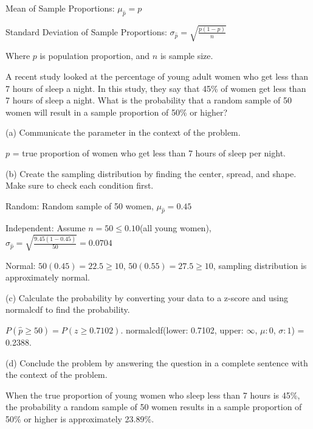\documentclass[../stats.tex]{subfiles}
\begin{document}
Mean of Sample Proportions: $\mu_{\hat{p}}=p$

Standard Deviation of Sample Proportions: $\sigma_{\hat{p}}=\sqrt{\frac{p(1-p)}{n}}$

Where $p$ is population proportion, and $n$ is sample size.

\pagebreak
\begin{example}
    A recent study looked at the percentage of young adult women who get less than 7 hours of sleep a night. In this study, they say that 45\% of women get less than 7 hours of sleep a night.
    What is the probability that a random sample of 50 women will result in a sample proportion of 50\% or higher?

    (a) Communicate the parameter in the context of the problem.

    $p$ = true proportion of women who get less than 7 hours of sleep per night.

    (b) Create the sampling distribution by finding the center, spread, and shape. Make sure to check each condition first.

    Random: Random sample of 50 women, $\mu_{\hat{p}}=0.45$

    Independent: Assume $n=50\leq 0.10$(all young women), $\sigma_{\hat{p}}=\sqrt{\frac{9.45(1-0.45)}{50}}=0.0704$

    Normal: $50(0.45)=22.5\geq 10$, $50(0.55)=27.5\geq 10$, sampling distribution is approximately normal.

    (c) Calculate the probability by converting your data to a z-score and using normalcdf to find the probability.

    $P(\hat{p}\geq 50)=P(z\geq 0.7102)$. normalcdf(lower: 0.7102, upper: $\infty$, $\mu: 0$, $\sigma:1$) = 0.2388.

    (d) Conclude the problem by answering the question in a complete sentence with the context of the problem.

    When the true proportion of young women who sleep less than 7 hours is 45\%, the probability a random sample of 50 women results in a sample proportion of 50\% or higher is approximately 23.89\%.
\end{example}
\end{document}
